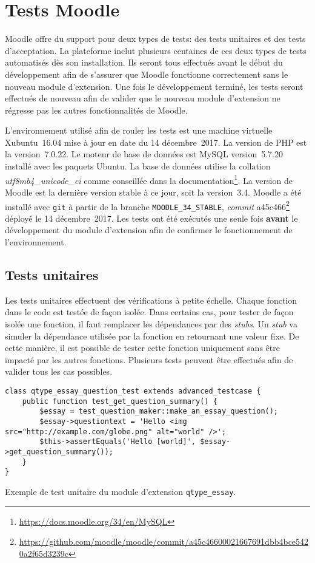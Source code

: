 \chapter{Tests Moodle}
Moodle offre du support pour deux types de tests: des tests unitaires et des tests d'acceptation.
La plateforme inclut plusieurs centaines de ces deux types de tests automatis\'es d\`es son installation.
Ils seront tous effectu\'es avant le d\'ebut du d\'eveloppement afin de s'assurer que Moodle fonctionne correctement sans le nouveau module d'extension.
Une fois le d\'eveloppement termin\'e, les tests seront effectu\'es de nouveau afin de valider que le nouveau module d'extension ne r\'egresse pas les autres fonctionnalit\'es de Moodle.

L'environnement utilis\'e afin de rouler les tests est une machine virtuelle Xubuntu~16.04 mise \`a jour en date du 14 d\'ecembre~2017.
La version de PHP est la version~7.0.22.
Le moteur de base de donn\'ees est MySQL version~5.7.20 install\'e avec les paquets Ubuntu.
La base de donn\'ees utilise la collation \textit{utf8mb4\_unicode\_ci} comme conseill\'ee dans la documentation\footnote{\url{https://docs.moodle.org/34/en/MySQL}}.
La version de Moodle est la derni\`ere version stable \`a ce jour, soit la version~3.4.
Moodle a \'et\'e install\'e avec \texttt{git} \`a partir de la branche \texttt{MOODLE\_34\_STABLE}, \textit{commit} a45c466\footnote{\url{https://github.com/moodle/moodle/commit/a45c46600021667691dbb4bce5420a2f65d3239c}} d\'eploy\'e le 14 d\'ecembre~2017.
Les tests ont \'et\'e ex\'ecut\'es une seule fois \textbf{avant} le d\'eveloppement du module d'extension afin de confirmer le fonctionnement de l'environnement.

\section{Tests unitaires}
\label{test-unitaires}
Les tests unitaires effectuent des v\'erifications \`a petite \'echelle.
Chaque fonction dans le code est test\'ee de fa\c{c}on isol\'ee.
Dans certains cas, pour tester de fa\c{c}on isol\'ee une fonction, il faut remplacer les d\'ependances par des \textit{stubs}.
Un \textit{stub} va simuler la d\'ependance utilis\'ee par la fonction en retournant une valeur fixe.
De cette mani\`ere, il est possible de tester cette fonction uniquement sans \^etre impact\'e par les autres fonctions.
Plusieurs tests peuvent \^etre effectu\'es afin de valider tous les cas possibles. \cite{tremblay16}

\begin{lstfloat}[htbp]
\begin{lstlisting}[frame=l]
class qtype_essay_question_test extends advanced_testcase {
    public function test_get_question_summary() {
        $essay = test_question_maker::make_an_essay_question();
        $essay->questiontext = 'Hello <img src="http://example.com/globe.png" alt="world" />';
        $this->assertEquals('Hello [world]', $essay->get_question_summary());
    }
}
\end{lstlisting}
\caption{Exemple de test unitaire du module d'extension \texttt{qtype\_essay}.}
\label{code:unittest}
\end{lstfloat}

